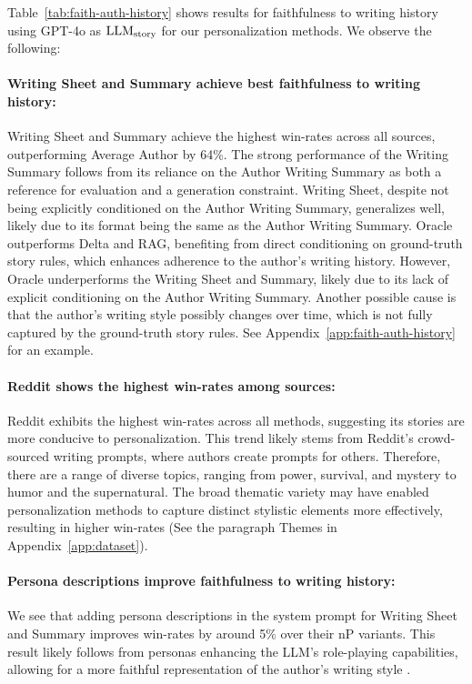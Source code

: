 Table~\ref{tab:faith-auth-history} shows results for faithfulness to writing history using GPT-4o as \(\text{LLM\textsubscript{story}}\) for our personalization methods. We observe the following:

\paragraph{Writing Sheet and Summary achieve best faithfulness to writing history:}  

Writing Sheet and Summary achieve the highest win-rates across all sources, outperforming Average Author by 64\%. The strong performance of the Writing Summary follows from its reliance on the Author Writing Summary as both a reference for evaluation and a generation constraint. Writing Sheet, despite not being explicitly conditioned on the Author Writing Summary, generalizes well, likely due to its format being the same as the Author Writing Summary. Oracle outperforms Delta and RAG, benefiting from direct conditioning on ground-truth story rules, which enhances adherence to the author's writing history. However, Oracle underperforms the Writing Sheet and Summary, likely due to its lack of explicit conditioning on the Author Writing Summary. Another possible cause is that the author's writing style possibly changes over time, which is not fully captured by the ground-truth story rules. See Appendix~\ref{app:faith-auth-history} for an example.


\paragraph{Reddit shows the highest win-rates among sources:} 
Reddit exhibits the highest win-rates across all methods, suggesting its stories are more conducive to personalization. This trend likely stems from Reddit's crowd-sourced writing prompts, where authors create prompts for others. Therefore, there are a range of diverse topics, ranging from power, survival, and mystery to humor and the supernatural. The broad thematic variety may have enabled personalization methods to capture distinct stylistic elements more effectively, resulting in higher win-rates (See the paragraph Themes in Appendix~\ref{app:dataset}).

\paragraph{Persona descriptions improve faithfulness to writing history:}
We see that adding persona descriptions in the system prompt for Writing Sheet and Summary improves win-rates by around 5\% over their nP variants. This result likely follows from personas enhancing the LLM’s role-playing capabilities, allowing for a more faithful representation of the author’s writing style \citep{jiang2024evaluating, wang-etal-2024-rolellm, wallace2024instruction}.


